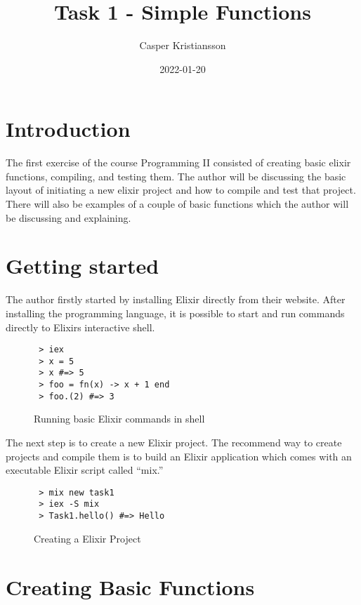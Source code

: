 \documentclass[a4paper,11pt]{article}
\begin{document}
\title{
    \textbf{Task 1 - Simple Functions}
}
\author{Casper Kristiansson}
\date{2022-01-20}
\maketitle

\section*{Introduction}

The first exercise of the course Programming II consisted of creating basic elixir functions, compiling, and testing them. The author will be discussing the basic layout of initiating a new elixir project and how to compile and test that project. There will also be examples of a couple of basic functions which the author will be discussing and explaining.

\section*{Getting started}

The author firstly started by installing Elixir directly from their website. After installing the programming language, it is possible to start and run commands directly to Elixirs interactive shell.

\begin{figure}[!ht]
\begin{verbatim}
 > iex
 > x = 5
 > x #=> 5
 > foo = fn(x) -> x + 1 end
 > foo.(2) #=> 3
\end{verbatim}
\caption{Running basic Elixir commands in shell}
\label{Figure:1}
\end{figure}

The next step is to create a new Elixir project. The recommend way to create projects and compile them is to build an Elixir application which comes with an executable Elixir script called “mix.”

\begin{figure}[!ht]
\begin{verbatim}
 > mix new task1
 > iex -S mix
 > Task1.hello() #=> Hello
\end{verbatim}
\caption{Creating a Elixir Project}
\label{Figure:2}
\end{figure}

\section*{Creating Basic Functions}
\end{document}
